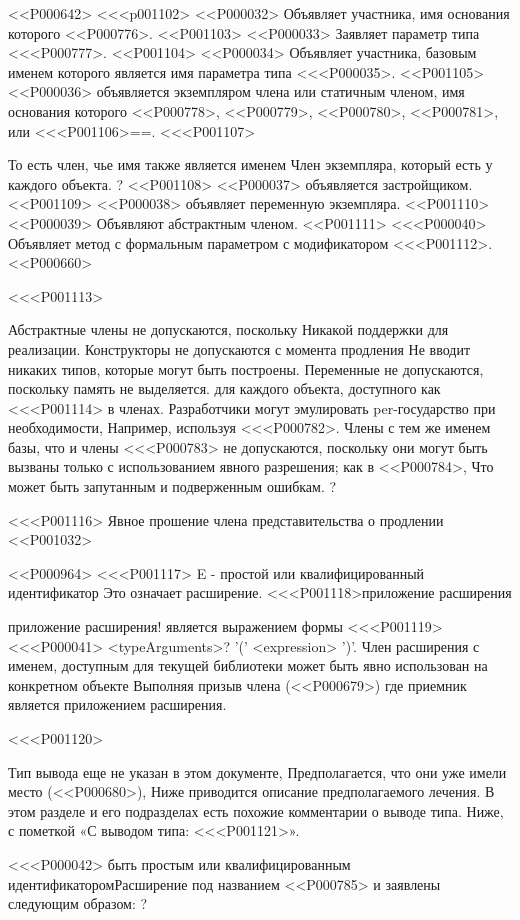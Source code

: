 {{{{{{{{{{{<<P000642>
<<<p001102> <<P000032> Объявляет участника, имя основания которого <<P000776>.
<<P001103> <<P000033> Заявляет параметр типа <<<P000777>.
<<P001104> <<P000034> Объявляет участника, базовым именем которого является имя параметра типа
<<<P000035>.
<<P001105> <<P000036> объявляется экземпляром члена или статичным членом, имя основания которого
<<P000778>, <<P000779>, <<P000780>, <<P000781>,
или <<<P001106>{==}.
<<<P001107>{%
То есть член, чье имя также является именем
Член экземпляра, который есть у каждого объекта.%
?
<<P001108> <<P000037> объявляется застройщиком.
<<P001109> <<P000038> объявляет переменную экземпляра.
<<P001110> <<P000039> Объявляют абстрактным членом.
<<P001111> <<<P000040> Объявляет метод с формальным параметром
с модификатором <<<P001112>.
<<P000660>

<<<P001113>{%
Абстрактные члены не допускаются, поскольку
Никакой поддержки для реализации.
%
Конструкторы не допускаются с момента продления
Не вводит никаких типов, которые могут быть построены.
%
Переменные не допускаются, поскольку память не выделяется.
для каждого объекта, доступного как <<<P001114>{} в членах.
Разработчики могут эмулировать per-\THIS государство при необходимости,
Например, используя <<<P000782>.
%
Члены с тем же именем базы, что и члены <<<P000783>
не допускаются, поскольку они могут быть вызваны только с использованием явного разрешения;
как в <<P000784>,
Что может быть запутанным и подверженным ошибкам.%
?


<<<P001116> Явное прошение члена представительства о продлении
<<P001032>

<<P000964>%
<<<P001117> E - простой или квалифицированный идентификатор
Это означает расширение.
<<<P001118>{приложение расширения}{приложение расширения!
является выражением формы
<<<P001119><<<P000041> <typeArguments>? '(' <expression> ')'.
Член расширения с именем, доступным для текущей библиотеки
может быть явно использован на конкретном объекте
Выполняя призыв члена
(<<P000679>)
где приемник является приложением расширения.

<<<P001120>{%
Тип вывода еще не указан в этом документе,
Предполагается, что они уже имели место
(<<P000680>),
Ниже приводится описание предполагаемого лечения.
В этом разделе и его подразделах есть похожие комментарии о выводе типа.
Ниже, с пометкой «С выводом типа: <<<P001121>».

<<<P000042> быть простым или квалифицированным идентификаторомРасширение под названием <<P000785> и заявлены следующим образом:%
?

}}}}}}}}}}}}}}}
